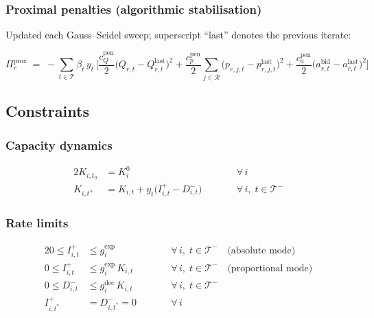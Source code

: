\documentclass[11pt]{article}
\newcommand{\R}{\mathcal{R}}
\newcommand{\T}{\mathcal{T}}
\newcommand{\Tminus}{\mathcal{T}^{-}}
\newcommand{\tmin}{t_{0}}
\newcommand{\tmax}{t^{*}}
\newcommand{\tnext}{t^{+}}
\begin{document}
\subsubsection*{Proximal penalties (algorithmic stabilisation)}

Updated each Gauss--Seidel sweep; superscript ``last'' denotes
the previous iterate:

\begin{equation}\label{eq:ulp-prox}
  \Pi^{\mathrm{prox}}_r
  \;=\;
  -\sum_{t\in\T}\beta_t\,y_t\,\Biggl[
    \frac{c^{\mathrm{pen}}_Q}{2}
      \bigl(Q_{r,t}-Q^{\mathrm{last}}_{r,t}\bigr)^{2}
    + \frac{c^{\mathrm{pen}}_p}{2}
      \sum_{j\in\R}\bigl(p_{r,j,t}-p^{\mathrm{last}}_{r,j,t}\bigr)^{2}
    + \frac{c^{\mathrm{pen}}_a}{2}
      \bigl(a^{\mathrm{bid}}_{r,t}-a^{\mathrm{last}}_{r,t}\bigr)^{2}
  \Biggr]
\end{equation}

\subsection{Constraints}

\subsubsection*{Capacity dynamics}

\begin{alignat}{2}
  \label{eq:kcap-init}
  K_{i,\tmin} &= K^{0}_i
    &&\qquad \forall\,i \\[4pt]
  \label{eq:kcap-trans}
  K_{i,\tnext} &= K_{i,t} + y_t\bigl(I^{+}_{i,t} - D^{-}_{i,t}\bigr)
    &&\qquad \forall\,i,\; t\in\Tminus
\end{alignat}

\subsubsection*{Rate limits}

\begin{alignat}{2}
  \label{eq:icap-ub-abs}
  0 \le I^{+}_{i,t} &\le g^{\mathrm{exp}}_i
    &&\qquad \forall\,i,\; t\in\Tminus
    \quad\text{(absolute mode)} \\[3pt]
  \label{eq:icap-ub-prop}
  0 \le I^{+}_{i,t} &\le g^{\mathrm{exp}}_i\,K_{i,t}
    &&\qquad \forall\,i,\; t\in\Tminus
    \quad\text{(proportional mode)} \\[3pt]
  \label{eq:dcap-ub}
  0 \le D^{-}_{i,t} &\le g^{\mathrm{dec}}_i\,K_{i,t}
    &&\qquad \forall\,i,\; t\in\Tminus \\[3pt]
  \label{eq:terminal-zero}
  I^{+}_{i,\tmax} &= D^{-}_{i,\tmax} = 0
    &&\qquad \forall\,i
\end{alignat}
\end{document}
